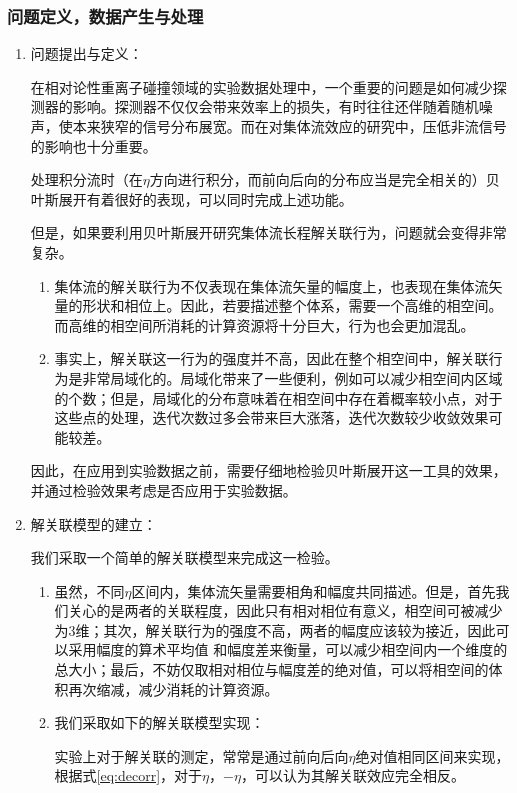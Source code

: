 \documentclass[aps,pre,12pt,preprint,onecolumn,showpacs,showkeys]{revtex4-1}
\begin{document}
\subsubsection{问题定义，数据产生与处理}
\begin{enumerate}
    \item 问题提出与定义：\par
    在相对论性重离子碰撞领域的实验数据处理中，一个重要的问题是如何减少探测器的影响。探测器不仅仅会带来效率上的损失，有时往往还伴随着随机噪声，使本来狭窄的信号分布展宽。而在对集体流效应的研究中，压低非流信号的影响也十分重要。
    \par
    处理积分流时（在$\eta$方向进行积分，而前向后向的分布应当是完全相关的）贝叶斯展开有着很好的表现，可以同时完成上述功能\cite{PhysRevC.88.014907}。\par
    但是，如果要利用贝叶斯展开研究集体流长程解关联行为，问题就会变得非常复杂。
    \begin{enumerate}
        \item 集体流的解关联行为不仅表现在集体流矢量的幅度上，也表现在集体流矢量的形状和相位上。因此，若要描述整个体系，需要一个高维的相空间。而高维的相空间所消耗的计算资源将十分巨大，行为也会更加混乱。
        \item 事实上，解关联这一行为的强度并不高，因此在整个相空间中，解关联行为是非常局域化的。局域化带来了一些便利，例如可以减少相空间内区域的个数；但是，局域化的分布意味着在相空间中存在着概率较小点，对于这些点的处理，迭代次数过多会带来巨大涨落，迭代次数较少收敛效果可能较差。
    \end{enumerate}
    因此，在应用到实验数据之前，需要仔细地检验贝叶斯展开这一工具的效果，并通过检验效果考虑是否应用于实验数据。
    \item 解关联模型的建立：\par
    我们采取一个简单的解关联模型来完成这一检验。\par
    \begin{enumerate}
        \item 虽然，不同$\eta$区间内，集体流矢量需要相角和幅度共同描述。但是，首先我们关心的是两者的关联程度，因此只有相对相位有意义，相空间可被减少为3维；其次，解关联行为的强度不高，两者的幅度应该较为接近，因此可以采用幅度的算术平均值
        和幅度差来衡量，可以减少相空间内一个维度的总大小；最后，不妨仅取相对相位与幅度差的绝对值，可以将相空间的体积再次缩减，减少消耗的计算资源。
        \item 我们采取如下的解关联模型实现：\par
        实验上对于解关联的测定，常常是通过前向后向$\eta$绝对值相同区间来实现，根据式\ref{eq:decorr}，对于$\eta$，$-\eta$，可以认为其解关联效应完全相反。

\end{enumerate}
\end{enumerate}
\end{document}
